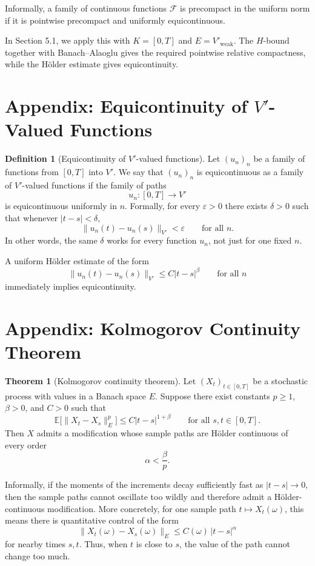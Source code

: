 \documentclass[11pt]{article}
\theoremstyle{definition}
\newtheorem{definition}{Definition}
\newtheorem{theorem}{Theorem}
\theoremstyle{remark}
\begin{document}
Informally, a family of continuous functions $\mathcal F$ is precompact in the uniform norm if it is pointwise precompact and uniformly equicontinuous.

In Section 5.1, we apply this with $K=[0,T]$ and $E=V'_{\mathrm{weak}}$. The $H$-bound together with Banach--Alaoglu gives the required pointwise relative compactness, while the H\"older estimate gives equicontinuity.

\section*{Appendix: Equicontinuity of $V'$-Valued Functions}
\begin{definition}[Equicontinuity of $V'$-valued functions]
Let $(u_n)_n$ be a family of functions from $[0,T]$ into $V'$. We say that $(u_n)_n$ is equicontinuous as a family of $V'$-valued functions if the family of paths
\[
  u_n:[0,T]\to V'
\]
is equicontinuous uniformly in $n$. Formally, for every $\varepsilon>0$ there exists $\delta>0$ such that whenever $|t-s|<\delta$,
\[
  \|u_n(t)-u_n(s)\|_{V'}<\varepsilon
  \qquad \text{for all } n.
\]
In other words, the same $\delta$ works for every function $u_n$, not just for one fixed $n$.
\end{definition}

A uniform H\"older estimate of the form
\[
  \|u_n(t)-u_n(s)\|_{V'}
  \le
  C|t-s|^\beta
  \qquad \text{for all } n
\]
immediately implies equicontinuity.

\section*{Appendix: Kolmogorov Continuity Theorem}
\begin{theorem}[Kolmogorov continuity theorem]
Let $(X_t)_{t\in[0,T]}$ be a stochastic process with values in a Banach space $E$. Suppose there exist constants $p\ge 1$, $\beta>0$, and $C>0$ such that
\[
  \mathbb E\bigl[\|X_t-X_s\|_E^p\bigr]
  \le
  C|t-s|^{1+\beta}
  \qquad \text{for all } s,t\in[0,T].
\]
Then $X$ admits a modification whose sample paths are H\"older continuous of every order
\[
  \alpha<\frac{\beta}{p}.
\]
\end{theorem}

Informally, if the moments of the increments decay sufficiently fast as $|t-s|\to 0$, then the sample paths cannot oscillate too wildly and therefore admit a H\"older-continuous modification. More concretely, for one sample path $t\mapsto X_t(\omega)$, this means there is quantitative control of the form
\[
  \|X_t(\omega)-X_s(\omega)\|_E
  \le
  C(\omega)\,|t-s|^\alpha
\]
for nearby times $s,t$. Thus, when $t$ is close to $s$, the value of the path cannot change too much.
\end{document}
